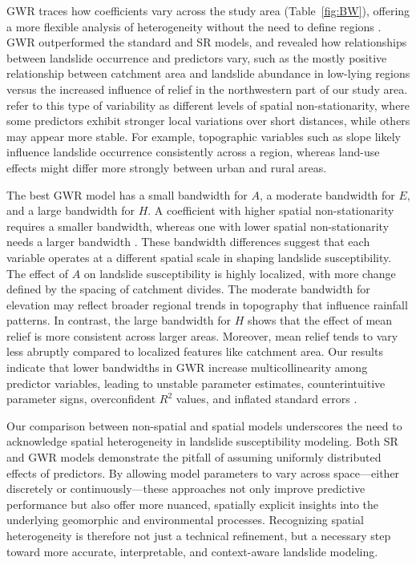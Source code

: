 \documentclass[lineno,pdflatex,sn-basic]{sn-jnl}%
\theoremstyle{thmstyleone}%
\theoremstyle{thmstyletwo}%
\theoremstyle{thmstylethree}%
\begin{document}
GWR traces how coefficients vary across the study area (Table~\ref{fig:BW}), offering a more flexible analysis of heterogeneity without the need to define regions \citep{wolf2018single}. GWR outperformed the standard and SR models, and revealed how relationships between landslide occurrence and predictors vary, such as the mostly positive relationship between catchment area and landslide abundance in low-lying regions versus the increased influence of relief in the northwestern part of our study area. \cite{fotheringham2009geographically} refer to this type of variability as different levels of spatial non-stationarity, where some predictors exhibit stronger local variations over short distances, while others may appear more stable. For example, topographic variables such as slope likely influence landslide occurrence consistently across a region, whereas land-use effects might differ more strongly between urban and rural areas. 

The best GWR model has a small bandwidth for \textbf{$A$}, a moderate bandwidth for \textbf{$E$}, and a large bandwidth for \textbf{$H$}. 
A coefficient with higher spatial non-stationarity requires a smaller bandwidth, whereas one with lower spatial non-stationarity needs a larger bandwidth \citep{chen2024spatial}. 
These bandwidth differences suggest that each variable operates at a different spatial scale in shaping landslide susceptibility.
The effect of $A$ on landslide susceptibility is highly localized, with more change defined by the spacing of catchment divides.
The moderate bandwidth for elevation may reflect broader regional trends in topography that influence rainfall patterns.
In contrast, the large bandwidth for $H$ shows that the effect of mean relief is more consistent across larger areas. Moreover, mean relief tends to vary less abruptly compared to localized features like catchment area.
Our results indicate that lower bandwidths in GWR increase multicollinearity among predictor variables, leading to unstable parameter estimates, counterintuitive parameter signs, overconfident $R^2$ values, and inflated standard errors \citep{kyriazos2023dealing}.

Our comparison between non-spatial and spatial models underscores the need to acknowledge spatial heterogeneity in landslide susceptibility modeling. 
Both SR and GWR models demonstrate the pitfall of assuming uniformly distributed effects of predictors.
By allowing model parameters to vary across space—either discretely or continuously—these approaches not only improve predictive performance but also offer more nuanced, spatially explicit insights into the underlying geomorphic and environmental processes. 
Recognizing spatial heterogeneity is therefore not just a technical refinement, but a necessary step toward more accurate, interpretable, and context-aware landslide modeling.
\end{document}
